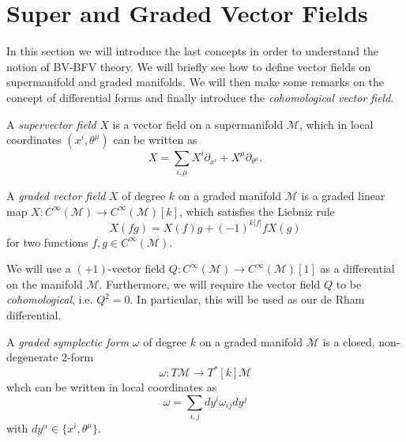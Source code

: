 \section{Super and Graded Vector Fields}
\label{sec:Sup_vector_fields}

In this section we will introduce the last concepts in order to understand the notion of BV-BFV theory.
We will briefly see how to define vector fields on supermanifold and graded manifolds.
We will then make some remarks on the concept of differential forms and finally introduce the \emph{cohomological vector field}.

\begin{definition}
    A \emph{supervector field} $X$ is a vector field on a supermanifold $\mathcal{M}$, which in local coordinates $(x^i, \theta^\mu)$ can be written as
    \begin{equation*}
        X = \sum_{i, \mu} X^i \partial_{x^i} + X^\mu \partial_{\theta^\mu} .
    \end{equation*}
\end{definition}

\begin{definition}
    A \emph{graded vector field} $X$ of degree $k$ on a graded manifold $\mathcal{M}$ is a graded linear map $X: C^\infty(\mathcal{M}) \rightarrow C^\infty(\mathcal{M})[k]$, which satisfies the Liebniz rule
    \begin{equation*}
        X(fg) = X(f)g + (-1)^{k|f|} f X(g)
    \end{equation*}
    for two functions $f,g \in C^\infty(\mathcal{M})$.
\end{definition}

We will use a $(+1)$-vector field $Q: C^\infty(\mathcal{M}) \rightarrow C^\infty(\mathcal{M})[1]$ as a differential on the manifold $\mathcal{M}$.
Furthermore, we will require the vector field $Q$ to be \emph{cohomological}, i.e. $Q^2 = 0$.
In particular, this will be used as our de Rham differential.

\begin{definition}
    A \emph{graded symplectic form} $\omega$ of degree $k$ on a graded manifold $\mathcal{M}$ is a closed, non-degenerate $2$-form
    \begin{equation*}
        \omega : T\mathcal{M} \rightarrow T^*[k]\mathcal{M}
    \end{equation*}
    whch can be written in local coordinates as
    \begin{equation*}
        \omega = \sum_{i,j} dy^i \omega_{ij} dy^j
    \end{equation*}
    with $dy^\alpha \in \{x^i, \theta^\mu\}$.
\end{definition}
